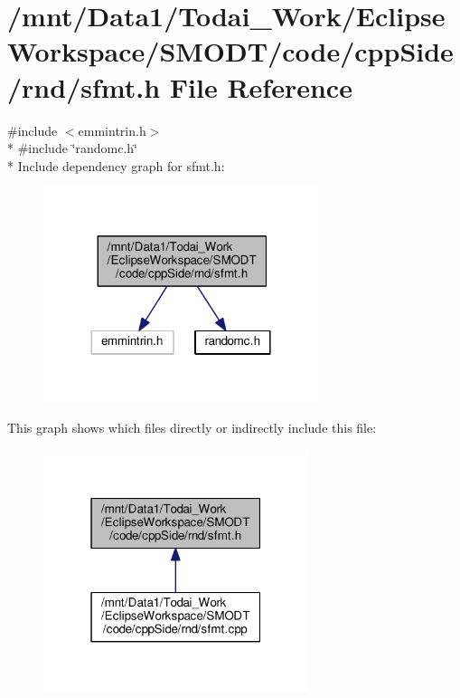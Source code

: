 \section{/mnt/\-Data1/\-Todai\-\_\-\-Work/\-Eclipse\-Workspace/\-S\-M\-O\-D\-T/code/cpp\-Side/rnd/sfmt.h File Reference}
\label{rnd_2sfmt_8h}
{\ttfamily \#include $<$emmintrin.\-h$>$}\\*
{\ttfamily \#include \char`\"{}randomc.\-h\char`\"{}}\\*
Include dependency graph for sfmt.\-h\-:
\nopagebreak
\begin{figure}[H]
\begin{center}
\leavevmode
\includegraphics[width=228pt]{rnd_2sfmt_8h__incl}
\end{center}
\end{figure}
This graph shows which files directly or indirectly include this file\-:
\nopagebreak
\begin{figure}[H]
\begin{center}
\leavevmode
\includegraphics[width=220pt]{rnd_2sfmt_8h__dep__incl}
\end{center}
\end{figure}
